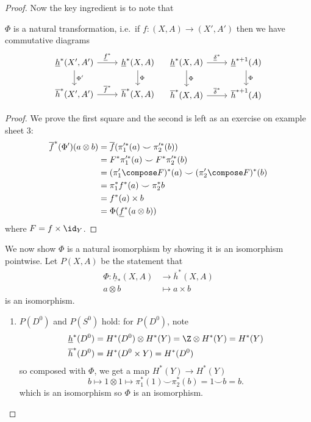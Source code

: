\documentclass[a4paper]{article}
\newcommand*{\cp}{\smile} %
\begin{document}
\begin{proof}
  Now the key ingredient is to note that
  \begin{lemma}
    \(\Phi\) is a natural transformation, i.e.\ if \(f: (X, A) \to (X', A')\) then we have commutative diagrams
    \[
      \begin{tikzcd}
        \underline h^*(X', A') \ar[r, "\underline f^*"] \ar[d, "\Phi'"] & \underline h^*(X, A) \ar[d, "\Phi"] \\
        \overline h^*(X', A') \ar[r, "\overline f^*"] & \overline h^*(X, A)
      \end{tikzcd}
      \quad
      \begin{tikzcd}
        \underline h^*(X, A) \ar[r, "\underline \delta^*"] \ar[d, "\Phi"] & \underline h^{* + 1}(A) \ar[d, "\Phi"] \\
        \overline h^*(X, A) \ar[r, "\overline \delta^*"] & \overline h^{* + 1}(A)
      \end{tikzcd}
    \]
  \end{lemma}

  \begin{proof}
    We prove the first square and the second is left as an exercise on example sheet 3:
    \begin{align*}
      \overline f^*(\Phi')(a \otimes b)
      &= \overline f(\pi_1'^*(a) \cp \pi_2'^*(b)) \\
      &= F^* \pi_1'^*(a) \cp F^* \pi_2'^*(b) \\
      &= (\pi_1' \compose F)^*(a) \cp (\pi_2' \compose F)^*(b) \\
      &= \pi_1^* f^*(a) \cp \pi_2^* b \\
      &= f^*(a) \times b \\
      &= \Phi(\underline f^*(a \otimes b))
    \end{align*}
    where \(F = f \times \id_Y\).
  \end{proof}

  We now show \(\Phi\) is a natural isomorphism by showing it is an isomorphism pointwise. Let \(P(X, A)\) be the statement that
  \begin{align*}
    \Phi: \underline h_*(X, A) &\to \overline h^*(X, A) \\
    a \otimes b &\mapsto a \times b
  \end{align*}
  is an isomorphism.

  \begin{enumerate}
  \item \(P(D^0)\) and \(P(S^0)\) hold: for \(P(D^0)\), note
    \begin{align*}
      \underline h^*(D^0) &= H^*(D^0) \otimes H^*(Y) = \Z \otimes H^*(Y) = H^*(Y) \\
      \overline h^*(D^0) &= H^*(D^0 \times Y) = H^*(D^0)
    \end{align*}
    so composed with \(\Phi\), we get a map \(H^*(Y) \to H^*(Y)\)
    \[
      b \mapsto 1 \otimes 1 \mapsto \pi_1^*(1) \cp \pi_2^*(b) = 1 \cp b = b.
    \]
    which is an isomorphism so \(\Phi\) is an isomorphism.
    

\end{enumerate}
\end{proof}
\end{document}
